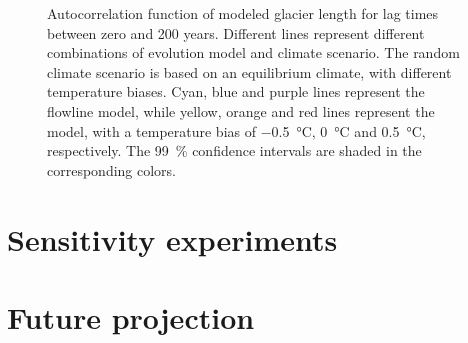 \begin{figure}[htp]
\begin{subfigure}[b]{0.48\textwidth}
        \end{subfigure}

        \caption{Autocorrelation function of modeled glacier length for lag times between zero and 200 years. Different lines represent different combinations of evolution model and climate scenario.
        The random climate scenario is based on an equilibrium climate, with different temperature biases.
        Cyan, blue and purple lines represent the flowline model, while yellow, orange and red lines represent the \vas{} model, with a temperature bias of \SI{-.5}{\celsius}, \SI{0}{\celsius} and \SI{+.5}{\celsius}, respectively.
        The \SI{99}{\percent} confidence intervals are shaded in the corresponding colors.}
        \label{fig:acf}
      \end{figure}
    


\section{Sensitivity experiments} %
\label{sec:sensitivity_experiments_results}


\section{Future projection} %
\label{sec:future_projection_results}

